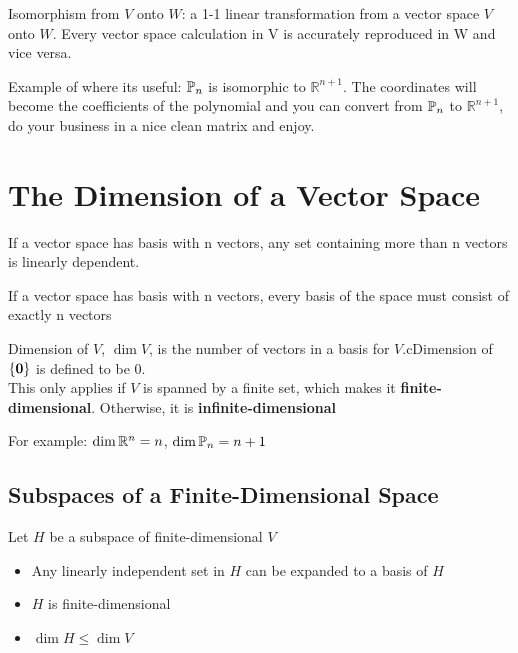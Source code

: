 \documentclass{report}
\begin{document}
\begin{definition}
    Isomorphism from $V$ onto $W$: a 1-1 linear transformation from a vector space
    $V$ onto $W$. Every vector space calculation in V is accurately reproduced in W
    and vice versa.
\end{definition}
Example of where its useful: $\mathbb{P}_n$ is isomorphic to $\mathbb{R}^{n+1}$.
The coordinates will become the coefficients of the polynomial and you can 
convert from $\mathbb{P}_n$ to $\mathbb{R}^{n+1}$, do your business in a nice
clean matrix and enjoy.

\section{The Dimension of a Vector Space}

\begin{theorem}
    If a vector space has basis with n vectors, any set containing more than 
    n vectors is linearly dependent.
\end{theorem}

\begin{theorem}
    If a vector space has basis with n vectors, every basis of the space must consist
    of exactly n vectors
\end{theorem}

\begin{definition}
    Dimension of $V$, $\dim V$, is the number of vectors in a basis for $V$.cDimension of $\{\mathbf{0}\}$ is defined to be $0$. \\
    This only applies if $V$ is spanned by a finite set, which makes it \textbf{finite-dimensional}. Otherwise, it is
    \textbf{infinite-dimensional}
\end{definition}

For example: $\dim \mathbb{R}^n = n$, $\dim \mathbb{P}_n = n + 1$

\subsection{Subspaces of a Finite-Dimensional Space}

\begin{theorem}
    Let $H$ be a subspace of finite-dimensional $V$ 
    \begin{itemize}
        \item Any linearly independent set in $H$ can be expanded to a basis of $H$
        \item $H$ is finite-dimensional
        \item $\dim H \le \dim V$
    \end{itemize} 
\end{theorem}
\end{document}
